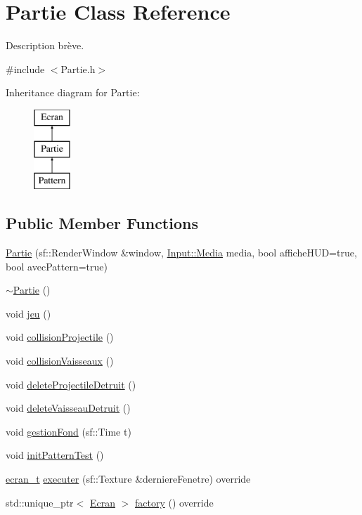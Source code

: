 \hypertarget{class_partie}{}\section{Partie Class Reference}
\label{class_partie}


Description brève.  




{\ttfamily \#include $<$Partie.\+h$>$}

Inheritance diagram for Partie\+:\begin{figure}[H]
\begin{center}
\leavevmode
\includegraphics[height=3.000000cm]{class_partie}
\end{center}
\end{figure}
\subsection*{Public Member Functions}
\begin{DoxyCompactItemize}
\item 
\mbox{\hyperlink{class_partie_a480ca8b79b54d01f4d1f1722f6c42935}{Partie}} (sf\+::\+Render\+Window \&window, \mbox{\hyperlink{class_input__base_a455585e7933485981b3d7bfcad3a47c6}{Input\+::\+Media}} media, bool affiche\+H\+UD=true, bool avec\+Pattern=true)
\item 
\mbox{\hyperlink{class_partie_ae4afeb7336bb84427272cfb7018b5e3d}{$\sim$\+Partie}} ()
\item 
void \mbox{\hyperlink{class_partie_a38d54358098b3e5e47d0059a37bff5ea}{jeu}} ()
\item 
void \mbox{\hyperlink{class_partie_a2ed02302df62c0867ebec0fc83078da3}{collision\+Projectile}} ()
\item 
void \mbox{\hyperlink{class_partie_a97ce349fac7e91f3cd8cc2a547a35239}{collision\+Vaisseaux}} ()
\item 
void \mbox{\hyperlink{class_partie_a88b2fa21d16b97fc120ea4d0e35208af}{delete\+Projectile\+Detruit}} ()
\item 
void \mbox{\hyperlink{class_partie_ae3caf4ac1e50ac945783b1a0d79a85c7}{delete\+Vaisseau\+Detruit}} ()
\item 
void \mbox{\hyperlink{class_partie_af914b2accc0b0c92240af4f01ca7a646}{gestion\+Fond}} (sf\+::\+Time t)
\item 
void \mbox{\hyperlink{class_partie_a3a0c4920ea230fb971f278a1b22d87a9}{init\+Pattern\+Test}} ()
\item 
\mbox{\hyperlink{constantes_8h_a33e4f15dde10f34860a6b35be343ae56}{ecran\+\_\+t}} \mbox{\hyperlink{class_partie_a20962c87a84b89afc4bde92dcc74ac0d}{executer}} (sf\+::\+Texture \&derniere\+Fenetre) override
\item 
std\+::unique\+\_\+ptr$<$ \mbox{\hyperlink{class_ecran}{Ecran}} $>$ \mbox{\hyperlink{class_partie_ae0a8a91c00a070f0b324547a0075abc5}{factory}} () override
\end{DoxyCompactItemize}
